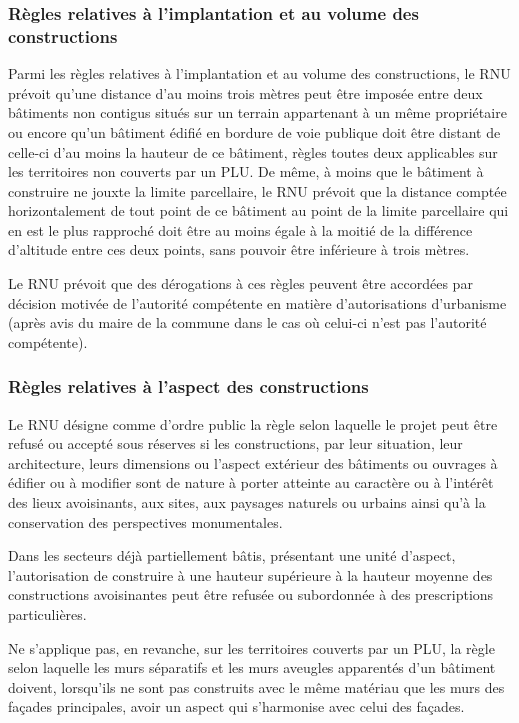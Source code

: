 		\subsubsection{Règles relatives à l'implantation et au volume des constructions}

			Parmi les règles relatives à l'implantation et au volume des constructions, le RNU prévoit qu'une distance d'au moins trois mètres peut être imposée entre deux bâtiments non contigus situés sur un terrain appartenant à un même propriétaire ou encore qu'un bâtiment édifié en bordure de voie publique doit être distant de celle-ci d'au moins la hauteur de ce bâtiment, règles toutes deux applicables sur les territoires non couverts par un PLU. De même, à moins que le bâtiment à construire ne jouxte la limite parcellaire, le RNU prévoit que la distance comptée horizontalement de tout point de ce bâtiment au point de la limite parcellaire qui en est le plus rapproché doit être au moins égale à la moitié de la différence d'altitude entre ces deux points, sans pouvoir être inférieure à trois mètres.

			Le RNU prévoit que des dérogations à ces règles peuvent être accordées par décision motivée de l'autorité compétente en matière d'autorisations d'urbanisme (après avis du maire de la commune dans le cas où celui-ci n'est pas l'autorité compétente).

		\subsubsection{Règles relatives à l'aspect des constructions}

			Le RNU désigne comme d'ordre public la règle selon laquelle le projet peut être refusé ou accepté sous réserves si les constructions, par leur situation, leur architecture, leurs dimensions ou l'aspect extérieur des bâtiments ou ouvrages à édifier ou à modifier sont de nature à porter atteinte au caractère ou à l'intérêt des lieux avoisinants, aux sites, aux paysages naturels ou urbains ainsi qu'à la conservation des perspectives monumentales.

			Dans les secteurs déjà partiellement bâtis, présentant une unité d'aspect, l'autorisation de construire à une hauteur supérieure à la hauteur moyenne des constructions avoisinantes peut être refusée ou subordonnée à des prescriptions particulières.

			Ne s'applique pas, en revanche, sur les territoires couverts par un PLU, la règle selon laquelle les murs séparatifs et les murs aveugles apparentés d'un bâtiment doivent, lorsqu'ils ne sont pas construits avec le même matériau que les murs des façades principales, avoir un aspect qui s'harmonise avec celui des façades.

